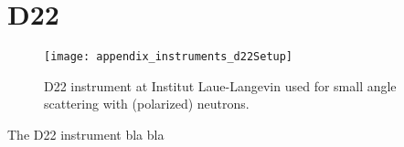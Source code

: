 \documentclass[\main/dresen_thesis.tex]{subfiles}
\begin{document}
\section{D22}\label{ch:appendix:lss:d22}
\begin{figure}[h]
  \centering
  \texttt{[image: appendix\_instruments\_d22Setup]}
  \caption{\label{fig:appendix:lss:d22}D22 instrument at Institut Laue-Langevin used for small angle scattering with (polarized) neutrons.}
\end{figure}
The D22 instrument bla bla
\end{document}
